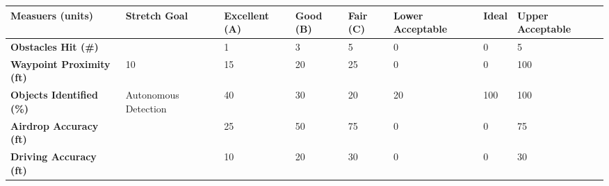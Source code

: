 \begin{table}[H]
	\centering
\begin{tabular}{|p{4.2cm}|p{2.1cm}|p{1.7cm}|p{1cm}|p{1cm}|p{1.7cm}|p{1cm}|p{1.7cm}|}
	\hline
	\textbf{Measuers (units)} & \textbf{Stretch Goal} & \textbf{Excellent (A)} & \textbf{Good (B)} & \textbf{Fair (C)} & \textbf{Lower Acceptable} & \textbf{Ideal} & \textbf{Upper Acceptable} \\
	\hline
	\textbf{Obstacles Hit (\#)} & & 1 & 3 & 5 & 0 & 0 & 5 \\
	\hline
	\textbf{Waypoint Proximity (ft)} & 10 & 15 & 20 & 25 & 0 & 0 & 100 \\
	\hline
	\textbf{Objects Identified (\%)} & Autonomous Detection & 40 & 30 & 20 & 20 & 100 & 100 \\
	\hline
	\textbf{Airdrop Accuracy (ft)} & & 25 & 50 & 75 & 0 & 0 & 75 \\
	\hline
	\textbf{Driving Accuracy (ft)} & & 10 & 20 & 30 & 0 & 0 & 30 \\
	\hline
\end{tabular}
\end{table}
